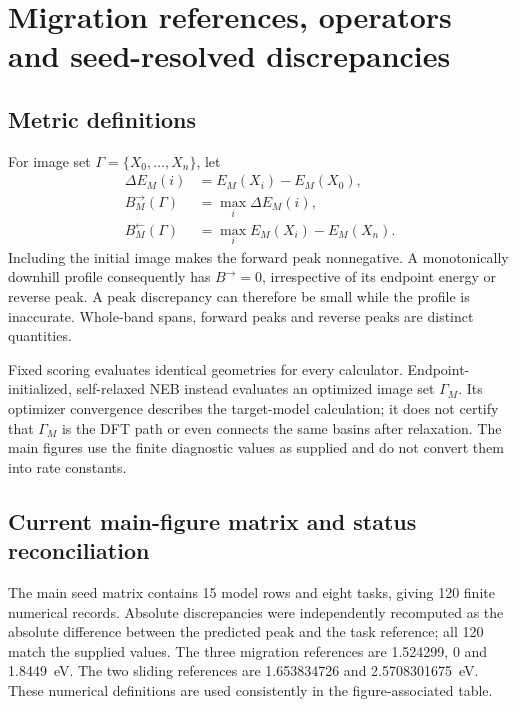 \documentclass[pdflatex,sn-mathphys-num]{sn-jnl}
\begin{document}
\section{Migration references, operators and seed-resolved discrepancies}\label{sec:migration}
\subsection{Metric definitions}
For image set $\Gamma=\{X_0,\ldots,X_n\}$, let
\begin{align}
\Delta E_M(i)&=E_M(X_i)-E_M(X_0),\\
B_M^\rightarrow(\Gamma)&=\max_i\Delta E_M(i),\\
B_M^\leftarrow(\Gamma)&=\max_i E_M(X_i)-E_M(X_n).
\end{align}
Including the initial image makes the forward peak nonnegative. A monotonically downhill profile consequently has $B^\rightarrow=0$, irrespective of its endpoint energy or reverse peak. A peak discrepancy can therefore be small while the profile is inaccurate. Whole-band spans, forward peaks and reverse peaks are distinct quantities.

Fixed scoring evaluates identical geometries for every calculator. Endpoint-initialized, self-relaxed NEB instead evaluates an optimized image set $\Gamma_M$. Its optimizer convergence describes the target-model calculation; it does not certify that $\Gamma_M$ is the DFT path or even connects the same basins after relaxation. The main figures use the finite diagnostic values as supplied and do not convert them into rate constants.

\subsection{Current main-figure matrix and status reconciliation}\label{sec:matrix_status}
The main seed matrix contains 15 model rows and eight tasks, giving 120 finite numerical records. Absolute discrepancies were independently recomputed as the absolute difference between the predicted peak and the task reference; all 120 match the supplied values. The three migration references are 1.524299, 0 and 1.8449~eV. The two sliding references are 1.653834726 and 2.5708301675~eV. These numerical definitions are used consistently in the figure-associated table.
\end{document}

